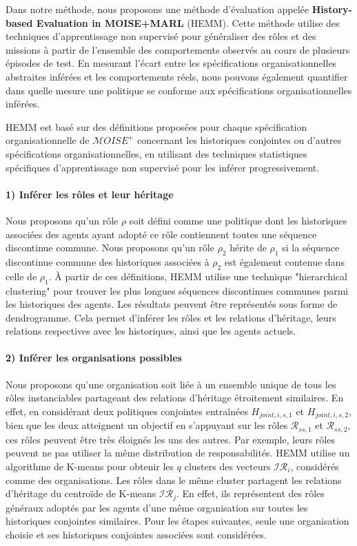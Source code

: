 \documentclass[sigconf,anonymous]{aamas}
\begin{document}
Dans notre méthode, nous proposons une méthode d'évaluation appelée \textbf{History-based Evaluation in MOISE+MARL} (HEMM). Cette méthode utilise des techniques d'apprentissage non supervisé pour généraliser des rôles et des missions à partir de l'ensemble des comportements observés au cours de plusieurs épisodes de test. En mesurant l'écart entre les spécifications organisationnelles abstraites inférées et les comportements réels, nous pouvons également quantifier dans quelle mesure une politique se conforme aux spécifications organisationnelles inférées.

HEMM est basé sur des définitions proposées pour chaque spécification organisationnelle de $\mathcal{M}OISE^+$ concernant les historiques conjointes ou d'autres spécifications organisationnelles, en utilisant des techniques statistiques spécifiques d'apprentissage non supervisé pour les inférer progressivement.

\paragraph{\textbf{1) Inférer les rôles et leur héritage}}

Nous proposons qu'un rôle $\rho$ soit défini comme une politique dont les historiques associées des agents ayant adopté ce rôle contiennent toutes une séquence discontinue commune. Nous proposons qu'un rôle $\rho_2$ hérite de $\rho_1$ si la séquence discontinue commune des historiques associées à $\rho_2$ est également contenue dans celle de $\rho_1$.
À partir de ces définitions, HEMM utilise une technique "hierarchical clustering" pour trouver les plus longues séquences discontinues communes parmi les historiques des agents. Les résultats peuvent être représentés sous forme de dendrogramme. Cela permet d'inférer les rôles et les relations d'héritage, leurs relations respectives avec les historiques, ainsi que les agents actuels.

\paragraph{\textbf{2) Inférer les organisations possibles}}

Nous proposons qu'une organisation soit liée à un ensemble unique de tous les rôles instanciables partageant des relations d'héritage étroitement similaires. En effet, en considérant deux politiques conjointes entraînées $H_{joint,i,s,1}$ et $H_{joint,i,s,2}$, bien que les deux atteignent un objectif en s'appuyant sur les rôles $\mathcal{R}_{ss,1}$ et $\mathcal{R}_{ss,2}$, ces rôles peuvent être très éloignés les uns des autres. Par exemple, leurs rôles peuvent ne pas utiliser la même distribution de responsabilités.
HEMM utilise un algorithme de K-means pour obtenir les $q$ clusters des vecteurs $\mathcal{IR}_{i}$, considérés comme des organisations. Les rôles dans le même cluster partagent les relations d'héritage du centroïde de K-means $\mathcal{IR}_j$. En effet, ils représentent des rôles généraux adoptés par les agents d'une même organisation sur toutes les historiques conjointes similaires.
Pour les étapes suivantes, seule une organisation choisie et ses historiques conjointes associées sont considérées.
\end{document}
